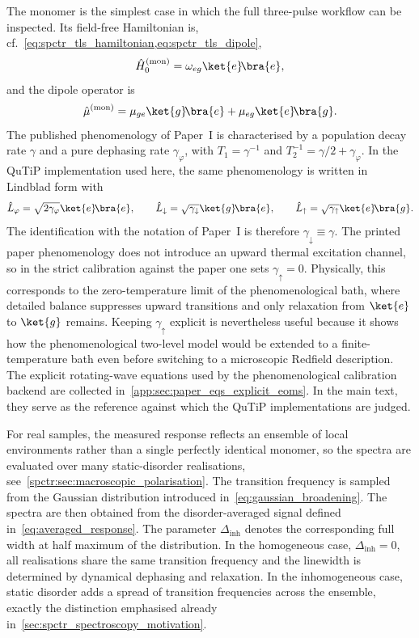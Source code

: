 The monomer is the simplest case in which the full three-pulse workflow can be inspected. Its field-free Hamiltonian is, cf.~\cref{eq:spctr_tls_hamiltonian,eq:spctr_tls_dipole},
\begin{equation*}
\hat{H}_{0}^{(\mathrm{mon})}=\omega_{eg}\ket{e}\!\bra{e},
\end{equation*}
and the dipole operator is
\begin{equation*}
\hat{\mu}^{(\mathrm{mon})}=\mu_{ge}\ket{g}\!\bra{e}+\mu_{eg}\ket{e}\!\bra{g}.
\end{equation*}
The published phenomenology of Paper~I is characterised by a population decay rate $\gamma$ and a pure dephasing rate $\gamma_{\varphi}$, with $T_1=\gamma^{-1}$ and $T_2^{-1}=\gamma/2+\gamma_{\varphi}$. In the QuTiP implementation used here, the same phenomenology is written in Lindblad form with
\begin{equation*}
\hat{L}_{\varphi}=\sqrt{2\gamma_{\varphi}}\ket{e}\!\bra{e},
\qquad
\hat{L}_{\downarrow}=\sqrt{\gamma_{\downarrow}}\ket{g}\!\bra{e},
\qquad
\hat{L}_{\uparrow}=\sqrt{\gamma_{\uparrow}}\ket{e}\!\bra{g}.
\end{equation*}
The identification with the notation of Paper~I is therefore $\gamma_{\downarrow}\equiv\gamma$. The printed paper phenomenology does not introduce an upward thermal excitation channel, so in the strict calibration against the paper one sets $\gamma_{\uparrow}=0$. Physically, this corresponds to the zero-temperature limit of the phenomenological bath, where detailed balance suppresses upward transitions and only relaxation from $\ket{e}$ to $\ket{g}$ remains. Keeping $\gamma_{\uparrow}$ explicit is nevertheless useful because it shows how the phenomenological two-level model would be extended to a finite-temperature bath even before switching to a microscopic Redfield description. The explicit rotating-wave equations used by the phenomenological calibration backend are collected in~\autoref{app:sec:paper_eqs_explicit_eoms}. In the main text, they serve as the reference against which the QuTiP implementations are judged.

For real samples, the measured response reflects an ensemble of local environments rather than a single perfectly identical monomer, so the spectra are evaluated over many static-disorder realisations, see~\autoref{spctr:sec:macroscopic_polarisation}. The transition frequency is sampled from the Gaussian distribution introduced in~\autoref{eq:gaussian_broadening}. The spectra are then obtained from the disorder-averaged signal defined in~\autoref{eq:averaged_response}. The parameter $\Delta_{\mathrm{inh}}$ denotes the corresponding full width at half maximum of the distribution. In the homogeneous case, $\Delta_{\mathrm{inh}}=0$, all realisations share the same transition frequency and the linewidth is determined by dynamical dephasing and relaxation. In the inhomogeneous case, static disorder adds a spread of transition frequencies across the ensemble, exactly the distinction emphasised already in~\autoref{sec:spctr_spectroscopy_motivation}.

